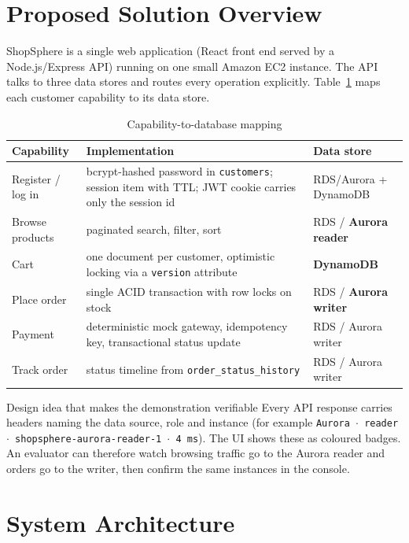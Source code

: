 \documentclass[11pt,a4paper]{article}
\begin{document}
\section{Proposed Solution Overview}
ShopSphere is a single web application (React front end served by a Node.js/Express API) running on one small Amazon EC2 instance. The API talks to three data stores and routes every operation explicitly. Table~\ref{tab:mapping} maps each customer capability to its data store.

\begin{table}[H]
\centering\small
\begin{tabularx}{\linewidth}{@{}l X l@{}}
\toprule
\textbf{Capability} & \textbf{Implementation} & \textbf{Data store}\\
\midrule
Register / log in & bcrypt-hashed password in \texttt{customers}; session item with TTL; JWT cookie carries only the session id & RDS/Aurora + DynamoDB\\
Browse products & paginated search, filter, sort & RDS / \textbf{Aurora reader}\\
Cart & one document per customer, optimistic locking via a \texttt{version} attribute & \textbf{DynamoDB}\\
Place order & single ACID transaction with row locks on stock & RDS / \textbf{Aurora writer}\\
Payment & deterministic mock gateway, idempotency key, transactional status update & RDS / Aurora writer\\
Track order & status timeline from \texttt{order\_status\_history} & RDS / Aurora writer\\
\bottomrule
\end{tabularx}
\caption{Capability-to-database mapping}
\label{tab:mapping}
\end{table}

\begin{keybox}{Design idea that makes the demonstration verifiable}
Every API response carries headers naming the data source, role and instance (for example \texttt{Aurora $\cdot$ reader $\cdot$ shopsphere-aurora-reader-1 $\cdot$ 4\,ms}). The UI shows these as coloured badges. An evaluator can therefore watch browsing traffic go to the Aurora reader and orders go to the writer, then confirm the same instances in the console.
\end{keybox}

\section{System Architecture}
\end{document}
